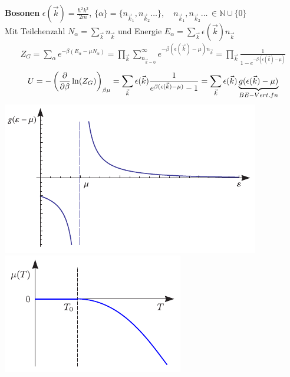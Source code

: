 




{\Huge
\textbf{Bosonen} \(\epsilon(\vec k)=\frac{\hbar^2k^2}{2m}\), \(\{\alpha \}=\{n_{\vec k_1},n_{\vec k_2}\dots \},\quad n_{\vec k_1},n_{\vec k_2}\dots \,\in \mathds N\cup\{0\} \)\\
Mit Teilchenzahl \(N_\alpha = \sum_{\vec k}n_{\vec k}\) und Energie \(E_\alpha= \sum_{\vec k}\epsilon(\vec k) n_{\vec k}\)
\begin{align*}
  Z_G = \sum_{\alpha}e^{-\beta(E_\alpha - \mu N_\alpha)}=\prod_{\vec k} \sum_{n_{\vec k=0}}^{\infty}e^{-\beta(\epsilon(\vec k) -\mu)n_{\vec k}}=\prod_{\vec k}\frac{1}{1 - e^{-\beta(\epsilon(\vec k)-\mu)}} 
\end{align*}
\begin{align*}
  U=-\left( \pdiff_\beta \ln(Z_G) \right)_{\beta\mu} = \sum_{\vec k}\epsilon(\vec k) \frac{1}{e^{\beta(\epsilon(\vec k)-\mu)}-1} = \sum_{\vec k}\epsilon(\vec k)\underbr{g(\epsilon(\vec k)-\mu)}_{BE-Vert.fn}
\end{align*}
\includegraphics[scale=0.60]{./verteilung-einstein-bose.png}
\includegraphics[scale=0.75]{./verteilung-einstein-bose-chemp.png}


}%

